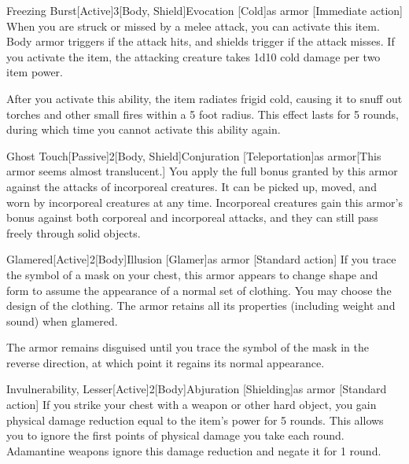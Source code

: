         \begin{magicitemdef}{Freezing Burst}[Active]{3}[Body, Shield]{Evocation [Cold]}{as armor}
            [Immediate action] When you are struck or missed by a melee attack, you can activate this item.
            Body armor triggers if the attack hits, and shields trigger if the attack misses.
            If you activate the item, the attacking creature takes 1d10 cold damage per two item power.

            After you activate this ability, the item radiates frigid cold, causing it to snuff out torches and other small fires within a 5 foot radius.
            This effect lasts for 5 rounds, during which time you cannot activate this ability again.
        \end{magicitemdef}

        \begin{magicitemdef}{Ghost Touch}[Passive]{2}[Body, Shield]{Conjuration [Teleportation]}{as armor}[This armor seems almost translucent.]
             You apply the full bonus granted by this armor against the attacks of incorporeal creatures.
            It can be picked up, moved, and worn by incorporeal creatures at any time.
            Incorporeal creatures gain this armor's bonus against both corporeal and incorporeal attacks, and they can still pass freely through solid objects.
        \end{magicitemdef}

        \begin{magicitemdef}{Glamered}[Active]{2}[Body]{Illusion [Glamer]}{as armor}
            [Standard action] If you trace the symbol of a mask on your chest, this armor appears to change shape and form to assume the appearance of a normal set of clothing.
            You may choose the design of the clothing.
            The armor retains all its properties (including weight and sound) when glamered.

            The armor remains disguised until you trace the symbol of the mask in the reverse direction, at which point it regains its normal appearance.
        \end{magicitemdef}

        \begin{magicitemdef}{Invulnerability, Lesser}[Active]{2}[Body]{Abjuration [Shielding]}{as armor}
            [Standard action] If you strike your chest with a weapon or other hard object, you gain physical damage reduction equal to the item's power for 5 rounds.
            This allows you to ignore the first points of physical damage you take each round.
            Adamantine weapons ignore this damage reduction and negate it for 1 round.
        \end{magicitemdef}

